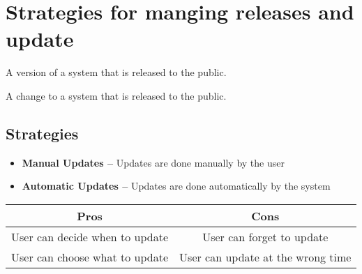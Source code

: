 \documentclass[12pt,fleqn]{book} %
\begin{document}
\section{Strategies for manging releases and update}
\begin{definition}[Release]
  A version of a system that is released to the public.
\end{definition}\par
\begin{definition}[Update]
  A change to a system that is released to the public.
\end{definition}\par

\subsection{Strategies}
\begin{itemize}
  \item \textbf{Manual Updates --} Updates are done manually by the user
  \item \textbf{Automatic Updates --} Updates are done automatically by the system
\end{itemize}

\begin{table}[h]
  \centering
  \begin{tabular}{|c|c|}
    \hline
    Pros & Cons \\
    \hline
    User can decide when to update & User can forget to update \\
    \hline
    User can choose what to update & User can update at the wrong time \\
    \hline
  \end{tabular}
\end{table}
\end{document}
